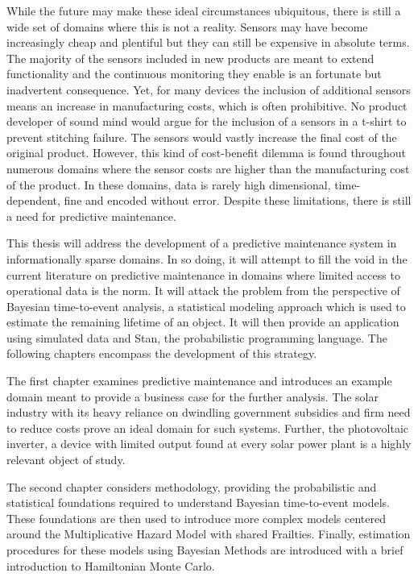 While the future may make these ideal circumstances ubiquitous, there is still a wide set of domains where this is not a reality. Sensors may have become increasingly cheap and plentiful but they can still be expensive in absolute terms. The majority of the sensors included in new products are meant to extend functionality and the continuous monitoring they enable is an fortunate but inadvertent consequence. Yet, for many devices the inclusion of additional sensors means an increase in manufacturing costs, which is often prohibitive. No product developer of sound mind would argue for the inclusion of a sensors in a t-shirt to prevent stitching failure. The sensors would vastly increase the final cost of the original product. However, this kind of cost-benefit dilemma is found throughout numerous domains where the sensor costs are higher than the manufacturing cost of the product. In these domains, data is rarely high dimensional, time-dependent, fine and encoded without error. Despite these limitations, there is still a need for predictive maintenance. 

This thesis will address the development of a predictive maintenance system in informationally sparse domains. In so doing, it will attempt to fill the void in the current literature on predictive maintenance in domains where limited access to operational data is the norm. It will attack the problem from the perspective of Bayesian time-to-event analysis, a statistical modeling approach which is used to estimate the remaining lifetime of an object. It will then provide an application using simulated data and Stan, the probabilistic programming language. The following chapters encompass the development of this strategy. 

The first chapter examines predictive maintenance and introduces an example domain meant to provide a business case for the further analysis. The solar industry with its heavy reliance on dwindling government subsidies and firm need to reduce costs prove an ideal domain for such systems. Further, the photovoltaic inverter, a device with limited output found at every solar power plant is a highly relevant object of study. 

The second chapter considers methodology, providing the probabilistic and statistical foundations required to understand Bayesian time-to-event models. These foundations are then used to introduce more complex models centered around the Multiplicative Hazard Model with shared Frailties. Finally, estimation procedures for these models using Bayesian Methods are introduced with a brief introduction to Hamiltonian Monte Carlo. 

